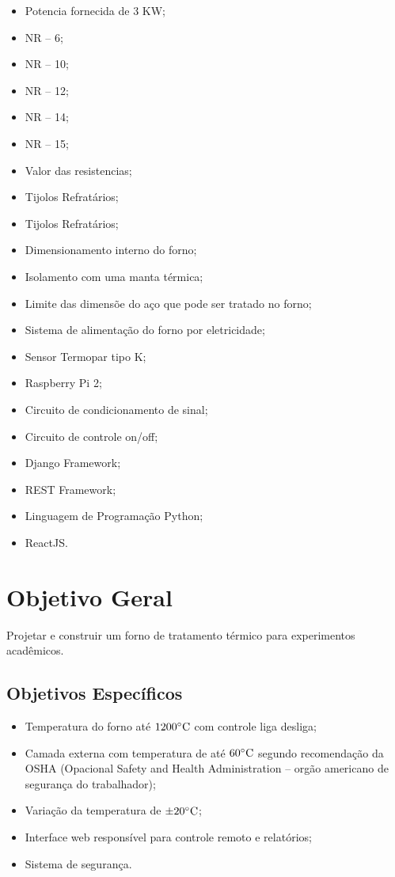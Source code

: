 \begin{itemize}
	\item Potencia fornecida de 3 KW;
	\item NR – 6;
	\item NR – 10;
	\item NR – 12;
	\item NR – 14;
	\item NR – 15;
	\item Valor das resistencias;
	\item Tijolos Refratários;
	\item Tijolos Refratários;
	\item Dimensionamento interno do forno;
	\item Isolamento com uma manta térmica;
	\item Limite das dimensõe do aço que pode ser tratado no forno;
	\item Sistema de alimentação do forno por eletricidade;
	\item Sensor Termopar tipo K;
	\item Raspberry Pi 2;
	\item Circuito de condicionamento de sinal;
	\item Circuito de controle on/off;
	\item Django Framework;
	\item REST Framework;
	\item Linguagem de Programação Python;
	\item ReactJS.
\end{itemize}

\section{Objetivo Geral}

Projetar e construir um forno de tratamento térmico para experimentos acadêmicos.

\subsection{Objetivos Específicos}

\begin{itemize}
	\item Temperatura do forno até $1200 \degree \text{C}$ com controle liga desliga;
	\item Camada externa com temperatura de até $60 \degree \text{C}$ segundo recomendação da OSHA (Opacional Safety and Health Administration – orgão americano de segurança do trabalhador);
	\item Variação da temperatura de $\pm 20 \degree \text{C}$;
	\item Interface web responsível para controle remoto e relatórios;
	\item Sistema de segurança.

\end{itemize}
